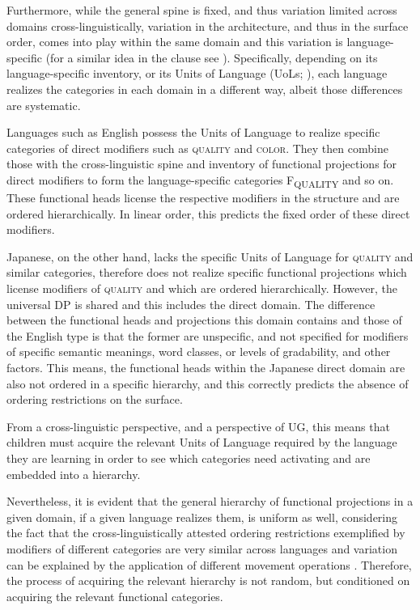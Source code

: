 \documentclass [output=book,colorlinks,citecolor=brown]{langscibook}
\begin{document}
Furthermore, while the general spine is fixed, and thus variation limited across domains cross-linguistically, variation in the architecture, and thus in the surface order, comes into play within the same domain and this variation is language-specific (for a similar idea in the clause see \citealt{ramchand:2014:deriving}). Specifically, depending on its language-specific inventory, or its Units of Language (UoLs; \citealt{wiltschko:2014:universal}), each language realizes the categories in each domain in a different way, albeit those differences are systematic.

Languages such as English possess the Units of Language to realize specific categories of direct modifiers such as \textsc{quality} and \textsc{color}. They then combine those with the cross-linguistic spine and inventory of functional projections for direct modifiers to form the language-specific categories F\textsubscript{QUALITY} and so on. These functional heads license the respective modifiers in the structure and are ordered hierarchically. In linear order, this predicts the fixed order of these direct modifiers. %

Japanese, on the other hand, lacks the specific Units of Language for \textsc{quality} and similar categories, therefore does not realize specific functional projections which license modifiers of \textsc{quality} and which are ordered hierarchically. However, the universal DP is shared and this includes the direct domain. The difference between the functional heads and projections this domain contains and those of the English type is that the former are unspecific, and not specified for modifiers of specific semantic meanings, word classes, or levels of gradability, and other factors. This means, the functional heads within the Japanese direct domain are also not ordered in a specific hierarchy, and this correctly predicts the absence of ordering restrictions on the surface.

From a cross-linguistic perspective, and a perspective of UG, this means that children must acquire the relevant Units of Language required by the language they are learning in order to see which categories need activating and are embedded into a hierarchy.

Nevertheless, it is evident that the general hierarchy of functional projections in a given domain, if a given language realizes them, is uniform as well, considering the fact that the cross-linguistically attested ordering restrictions exemplified by modifiers of different categories are very similar across languages and variation can be explained by the application of different movement operations \citep{cinque:2023:linearization, cinque:2025:superiority}. Therefore, the process of acquiring the relevant hierarchy is not random, but conditioned on acquiring the relevant functional categories. %
\end{document}
